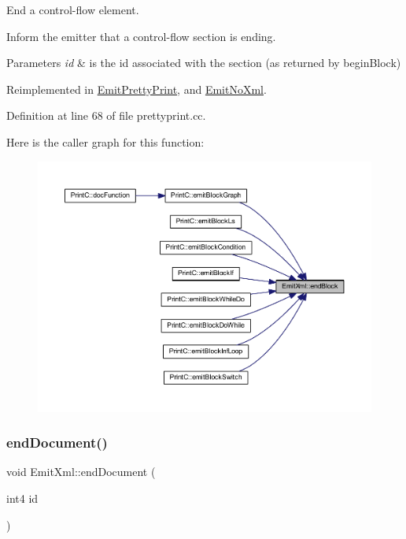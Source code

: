 End a control-\/flow element. 

Inform the emitter that a control-\/flow section is ending. 
\begin{DoxyParams}{Parameters}
{\em id} & is the id associated with the section (as returned by begin\+Block) \\
\hline
\end{DoxyParams}


Reimplemented in \mbox{\hyperlink{class_emit_pretty_print_a1d95f0f7503689370b28f9538690b5a4}{Emit\+Pretty\+Print}}, and \mbox{\hyperlink{class_emit_no_xml_ad9520b535d33c3501331078dbb97351b}{Emit\+No\+Xml}}.



Definition at line 68 of file prettyprint.\+cc.

Here is the caller graph for this function\+:
\nopagebreak
\begin{figure}[H]
\begin{center}
\leavevmode
\includegraphics[width=350pt]{class_emit_xml_a935b2c6ff63356ee30fa050c2b301bde_icgraph}
\end{center}
\end{figure}
\mbox{\label{class_emit_xml_a8f2e7a4f2cd9fee90bed1eb966414424}} 
\subsubsection{\texorpdfstring{endDocument()}{endDocument()}}
{\footnotesize\ttfamily void Emit\+Xml\+::end\+Document (\begin{DoxyParamCaption}\item[{int4}]{id }\end{DoxyParamCaption})\hspace{0.3cm}{\ttfamily [virtual]}}



